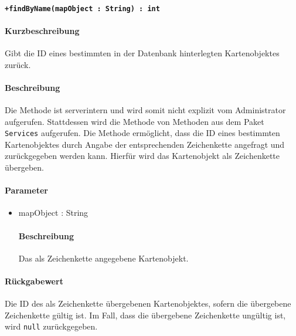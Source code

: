 \paragraph*{\texttt{+findByName(mapObject : String) : int}}%
\paragraph*{Kurzbeschreibung}
Gibt die ID eines bestimmten in der Datenbank hinterlegten Kartenobjektes zurück.
\paragraph*{Beschreibung}
Die Methode ist serverintern und wird somit nicht explizit vom Administrator aufgerufen.
Stattdessen wird die Methode von Methoden aus dem Paket \texttt{Services} aufgerufen.
Die Methode ermöglicht, dass die ID eines bestimmten Kartenobjektes durch Angabe der entsprechenden Zeichenkette angefragt und zurückgegeben werden kann.
Hierfür wird das Kartenobjekt als Zeichenkette übergeben.
\paragraph*{Parameter}
\begin{itemize}
    \item mapObject : String
    		\paragraph*{Beschreibung}
    		Das als Zeichenkette angegebene Kartenobjekt.
\end{itemize}
\paragraph*{Rückgabewert}
Die ID des als Zeichenkette übergebenen Kartenobjektes, sofern die übergebene Zeichenkette gültig ist.
Im Fall, dass die übergebene Zeichenkette ungültig ist, wird \texttt{null} zurückgegeben.
